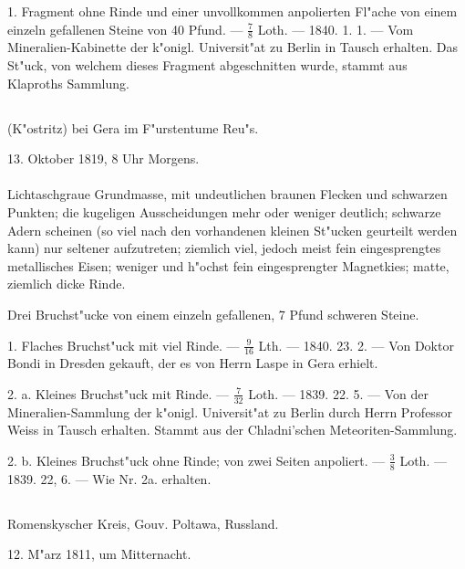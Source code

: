 \documentclass[a4paper, 11pt, oneside, polutonikogreek, german]{article}
\begin{document}
1. Fragment ohne Rinde und einer unvollkommen anpolierten Fl"ache von einem einzeln gefallenen Steine von 40 Pfund. --- $\mathfrak{\frac{7}{8}}$ Loth. --- 1840. 1. 1. --- Vom Mineralien-Kabinette der k"onigl. Universit"at zu Berlin in Tausch erhalten. Das St"uck, von welchem dieses Fragment abgeschnitten wurde, stammt aus Klaproths Sammlung.
\subsection{}
\begin{center}

(K"ostritz) bei Gera im F"urstentume Reu"s.

13. Oktober 1819, 8 Uhr Morgens.
\end{center}
\paragraph{}
Lichtaschgraue Grundmasse, mit undeutlichen braunen Flecken und schwarzen Punkten; die kugeligen Ausscheidungen mehr oder weniger deutlich; schwarze Adern scheinen (so viel nach den vorhandenen kleinen St"ucken geurteilt werden kann) nur seltener aufzutreten; ziemlich viel, jedoch meist fein eingesprengtes metallisches Eisen; weniger und h"ochst fein eingesprengter Magnetkies; matte, ziemlich dicke Rinde.

Drei Bruchst"ucke von einem einzeln gefallenen, 7 Pfund schweren Steine.

1. Flaches Bruchst"uck mit viel Rinde. --- $\mathfrak{\frac{9}{16}}$ Lth. --- 1840. 23. 2. --- Von Doktor Bondi in Dresden gekauft, der es von Herrn Laspe in Gera erhielt.

2. a. Kleines Bruchst"uck mit Rinde. --- $\mathfrak{\frac{7}{32}}$ Loth. --- 1839. 22. 5. --- Von der Mineralien-Sammlung der k"onigl. Universit"at zu Berlin durch Herrn Professor Weiss in Tausch erhalten. Stammt aus der Chladni'schen Meteoriten-Sammlung.

2. b. Kleines Bruchst"uck ohne Rinde; von zwei Seiten anpoliert. --- $\mathfrak{\frac{3}{8}}$ Loth. --- 1839. 22, 6. --- Wie Nr. 2a. erhalten.
\subsection{}
\begin{center}

Romenskyscher Kreis, Gouv. Poltawa, Russland.

12. M"arz 1811, um Mitternacht.
\end{center}
\end{document}
